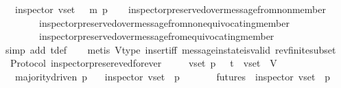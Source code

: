 \begin{isabellebody}
\ \ {\isasymlongrightarrow}\ inspector\ {\isacharparenleft}v{\isacharunderscore}set{\isacharcomma}\ {\isasymsigma}\ {\isasymunion}\ {\isacharbraceleft}m{\isacharbraceright}{\isacharcomma}\ p{\isacharparenright}{\isachardoublequoteclose}\isanewline
%
\isadelimproof
\ \ %
\endisadelimproof
%
\isatagproof
{}\isamarkupfalse%
\ inspector{\isacharunderscore}preserved{\isacharunderscore}over{\isacharunderscore}message{\isacharunderscore}from{\isacharunderscore}non{\isacharunderscore}member\isanewline
\ \ \ \ \ \ \ \ inspector{\isacharunderscore}preserved{\isacharunderscore}over{\isacharunderscore}message{\isacharunderscore}from{\isacharunderscore}non{\isacharunderscore}equivocating{\isacharunderscore}member\isanewline
\ \ \ \ \ \ \ \ inspector{\isacharunderscore}preserved{\isacharunderscore}over{\isacharunderscore}message{\isacharunderscore}from{\isacharunderscore}equivocating{\isacharunderscore}member\isanewline
\ \ \isamarkupfalse%
\ {\isacharparenleft}simp\ add{\isacharcolon}\ {\isasymSigma}t{\isacharunderscore}def{\isacharparenright}\isanewline
\ \ \isamarkupfalse%
\ {\isacharparenleft}metis\ V{\isacharunderscore}type\ insert{\isacharunderscore}iff\ message{\isacharunderscore}in{\isacharunderscore}state{\isacharunderscore}is{\isacharunderscore}valid\ rev{\isacharunderscore}finite{\isacharunderscore}subset{\isacharparenright}%
\endisatagproof
{\isafoldproof}%
%
\isadelimproof
\isanewline
%
\endisadelimproof
\isanewline
\isanewline
{}\isamarkupfalse%
\ {\isacharparenleft}\ Protocol{\isacharparenright}\ inspector{\isacharunderscore}presereved{\isacharunderscore}forever\ {\isacharcolon}\isanewline
\ \ {\isachardoublequoteopen}{\isasymforall}\ {\isasymsigma}\ v{\isacharunderscore}set\ p{\isachardot}\ {\isasymsigma}\ {\isasymin}\ {\isasymSigma}t\ {\isasymand}\ v{\isacharunderscore}set\ {\isasymsubseteq}\ V\ \isanewline
\ \ {\isasymlongrightarrow}\ majority{\isacharunderscore}driven\ p\isanewline
\ \ {\isasymlongrightarrow}\ inspector\ {\isacharparenleft}v{\isacharunderscore}set{\isacharcomma}\ {\isasymsigma}{\isacharcomma}\ p{\isacharparenright}\ \isanewline
\ \ {\isasymlongrightarrow}\ {\isacharparenleft}{\isasymforall}\ {\isasymsigma}{\isacharprime}\ {\isasymin}\ futures\ {\isasymsigma}{\isachardot}\ inspector\ {\isacharparenleft}v{\isacharunderscore}set{\isacharcomma}\ {\isasymsigma}{\isacharprime}{\isacharcomma}\ p{\isacharparenright}{\isacharparenright}{\isachardoublequoteclose}\isanewline
%
\isadelimproof
\ \ %
\endisadelimproof
%
\isatagproof
{}\isamarkupfalse%

\end{isabellebody}
